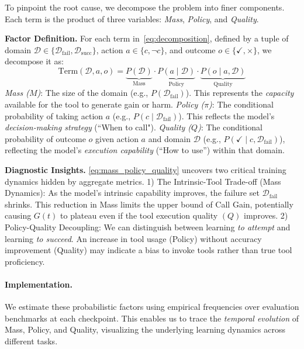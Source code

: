 To pinpoint the root cause, we decompose the problem into finer components.
%
Each term is the product of three variables: \textit{Mass}, \textit{Policy}, and \textit{Quality}.

\textbf{Factor Definition.}
%
For each term in~\cref{eq:decomposition}, defined by a tuple of domain $\mathcal{D} \in \{\mathcal{D}_{\text{fail}}, \mathcal{D}_{\text{succ}}\}$, action $a \in \{c, \neg c\}$, and outcome $o \in \{\checkmark, \times\}$, we decompose it as:
%
\begin{equation}
    \text{Term}(\mathcal{D}, a, o) = \underbrace{P(\mathcal{D})}_{\text{Mass}} \cdot \underbrace{P(a \mid \mathcal{D})}_{\text{Policy}} \cdot \underbrace{P(o \mid a, \mathcal{D})}_{\text{Quality}}
\label{eq:mass_policy_quality}
\end{equation}
%
\textit{Mass ($M$)}: The size of the domain (e.g., $P(\mathcal{D}_{\text{fail}})$). This represents the \textit{capacity} available for the tool to generate gain or harm.
%
\textit{Policy ($\pi$)}: The conditional probability of taking action $a$ (e.g., $P(c \mid \mathcal{D}_{\text{fail}})$). This reflects the model's \textit{decision-making strategy} (``When to call").
%
\textit{Quality ($Q$)}: The conditional probability of outcome $o$ given action $a$ and domain $\mathcal D$ (e.g., $P(\checkmark \mid c, \mathcal{D}_{\text{fail}})$), reflecting the model's \textit{execution capability} (``How to use'') within that domain.


\textbf{Diagnostic Insights.}
\cref{eq:mass_policy_quality} uncovers two critical training dynamics hidden by aggregate metrics.
1) The Intrinsic-Tool Trade-off (Mass Dynamics): As the model's intrinsic capability improves, the failure set $\mathcal{D}_{\text{fail}}$ shrinks.
%
This reduction in Mass limits the upper bound of Call Gain, potentially causing $G(t)$ to plateau even if the tool execution quality $(Q)$ improves.
%
2) Policy-Quality Decoupling: We can distinguish between learning \textit{to attempt} and learning \textit{to succeed}.
%
An increase in tool usage (Policy) without accuracy improvement (Quality) may indicate a bias to invoke tools rather than true tool proficiency.

\paragraph{Implementation.} We estimate these probabilistic factors using empirical frequencies over evaluation benchmarks at each checkpoint. This enables us to trace the \textit{temporal evolution} of Mass, Policy, and Quality, visualizing the underlying learning dynamics across different tasks.



